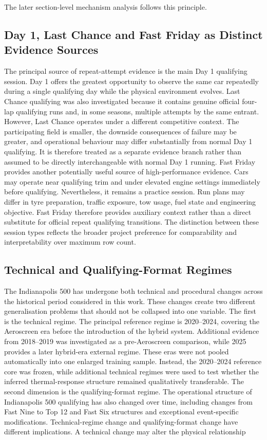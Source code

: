 The later section-level mechanism analysis follows this principle.

\subsection{Day 1, Last Chance and Fast Friday as Distinct Evidence Sources}
The principal source of repeat-attempt evidence is the main Day 1 qualifying session. Day 1 offers the greatest opportunity to observe the same car repeatedly during a single qualifying day while the physical environment evolves. Last Chance qualifying was also investigated because it contains genuine official four-lap qualifying runs and, in some seasons, multiple attempts by the same entrant. However, Last Chance operates under a different competitive context. The participating field is smaller, the downside consequences of failure may be greater, and operational behaviour may differ substantially from normal Day 1 qualifying. It is therefore treated as a separate evidence branch rather than assumed to be directly interchangeable with normal Day 1 running. Fast Friday provides another potentially useful source of high-performance evidence. Cars may operate near qualifying trim and under elevated engine settings immediately before qualifying. Nevertheless, it remains a practice session. Run plans may differ in tyre preparation, traffic exposure, tow usage, fuel state and engineering objective. Fast Friday therefore provides auxiliary context rather than a direct substitute for official repeat qualifying transitions. The distinction between these session types reflects the broader project preference for comparability and interpretability over maximum row count.

\subsection{Technical and Qualifying-Format Regimes}
The Indianapolis 500 has undergone both technical and procedural changes across the historical period considered in this work. These changes create two different generalisation problems that should not be collapsed into one variable. The first is the technical regime. The principal reference regime is 2020--2024, covering the Aeroscreen era before the introduction of the hybrid system. Additional evidence from 2018--2019 was investigated as a pre-Aeroscreen comparison, while 2025 provides a later hybrid-era external regime. These eras were not pooled automatically into one enlarged training sample. Instead, the 2020--2024 reference core was frozen, while additional technical regimes were used to test whether the inferred thermal-response structure remained qualitatively transferable. The second dimension is the qualifying-format regime. The operational structure of Indianapolis 500 qualifying has also changed over time, including changes from Fast Nine to Top 12 and Fast Six structures and exceptional event-specific modifications. Technical-regime change and qualifying-format change have different implications. A technical change may alter the physical relationship

